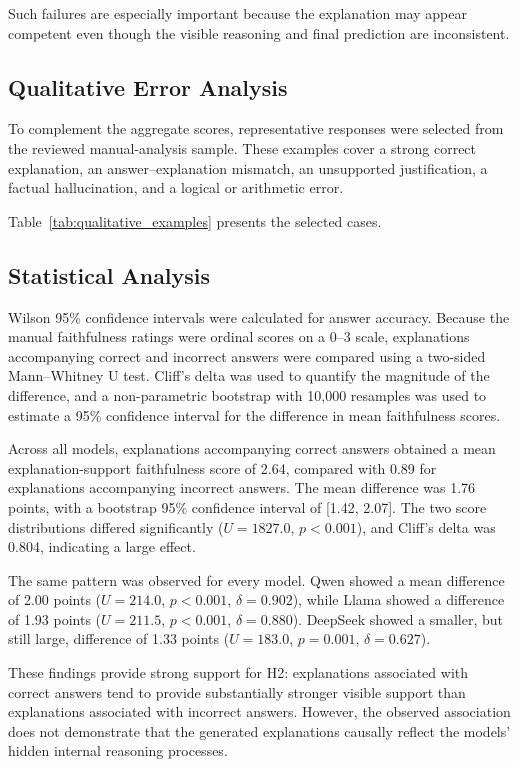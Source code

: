 \documentclass{article}
\begin{document}
Such failures are especially important because the explanation may
appear competent even though the visible reasoning and final prediction
are inconsistent.

\subsection{Qualitative Error Analysis}

To complement the aggregate scores, representative responses were
selected from the reviewed manual-analysis sample. These examples cover
a strong correct explanation, an answer--explanation mismatch, an
unsupported justification, a factual hallucination, and a logical or
arithmetic error.

Table~\ref{tab:qualitative_examples} presents the selected cases.





\subsection{Statistical Analysis}

Wilson 95\% confidence intervals were calculated for answer accuracy.
Because the manual faithfulness ratings were ordinal scores on a
0--3 scale, explanations accompanying correct and incorrect answers
were compared using a two-sided Mann--Whitney U test. Cliff's delta
was used to quantify the magnitude of the difference, and a
non-parametric bootstrap with 10,000 resamples was used to estimate a
95\% confidence interval for the difference in mean faithfulness
scores.

Across all models, explanations accompanying correct answers obtained
a mean explanation-support faithfulness score of 2.64, compared with
0.89 for explanations accompanying incorrect answers. The mean
difference was 1.76 points, with a bootstrap 95\% confidence interval
of [1.42, 2.07]. The two score distributions differed significantly
($U=1827.0$, $p<0.001$), and Cliff's delta was 0.804, indicating a
large effect.

The same pattern was observed for every model. Qwen showed a mean
difference of 2.00 points
($U=214.0$, $p<0.001$, $\delta=0.902$), while Llama showed a
difference of 1.93 points
($U=211.5$, $p<0.001$, $\delta=0.880$). DeepSeek showed a smaller,
but still large, difference of 1.33 points
($U=183.0$, $p=0.001$, $\delta=0.627$).

These findings provide strong support for H2: explanations associated
with correct answers tend to provide substantially stronger visible
support than explanations associated with incorrect answers. However,
the observed association does not demonstrate that the generated
explanations causally reflect the models' hidden internal reasoning
processes.
\end{document}
